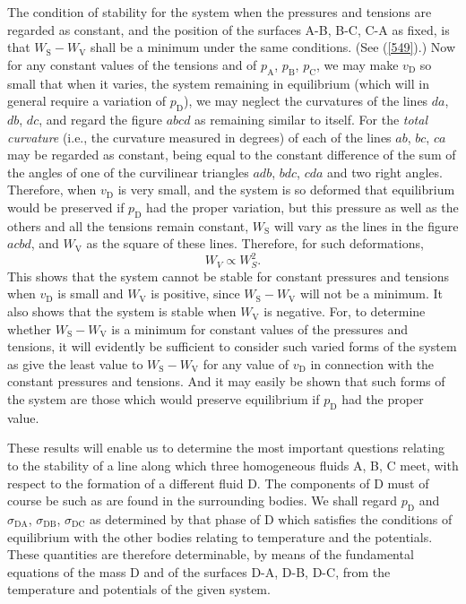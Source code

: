 \documentclass[12pt]{article}
\begin{document}
The condition of stability for the system when the pressures and tensions are regarded as constant, and the position of the surfaces A-B, B-C, C-A as fixed, is that $W_\text{S} - W_\text{V}$ shall be a minimum under the same conditions. (See (\ref{549}).) Now for any constant values of the tensions and of $p_\text{A}$, $p_\text{B}$, $p_\text{C}$, we may make $v_\text{D}$ so small that when it varies, the system remaining in equilibrium (which will in general require a variation of $p_\text{D}$), we may neglect the curvatures of the lines $da$, $db$, $dc$, and regard the figure $abcd$ as remaining similar to itself. For the \textit{total curvature} (i.e., the curvature measured in degrees) of each of the lines $ab$, $bc$, $ca$ may be regarded as constant, being equal to the constant difference of the sum of the angles of one of the curvilinear triangles $adb$, $bdc$, $cda$ and two right angles. Therefore, when $v_\text{D}$ is very small, and the system is so deformed that equilibrium would be preserved if $p_\text{D}$ had the proper variation, but this pressure as well as the others and all the tensions remain constant, $W_\text{S}$ will vary as the lines in the figure $acbd$, and $W_\text{V}$ as the square of these lines. Therefore, for such deformations,
$$ W_V \propto W_S^2. $$
This shows that the system cannot be stable for constant pressures and tensions when $v_\text{D}$ is small and $W_\text{V}$ is positive, since $W_\text{S}-W_\text{V}$ will not be a minimum. It also shows that the system is stable when $W_\text{V}$ is negative. For, to determine whether $W_\text{S}-W_\text{V}$ is a minimum for constant values of the pressures and tensions, it will evidently be sufficient to consider such varied forms of the system as give the least value to $W_\text{S}-W_\text{V}$ for any value of $v_\text{D}$ in connection with the constant pressures and tensions. And it may easily be shown that such forms of the system are those which would preserve equilibrium if $p_\text{D}$ had the proper value.

These results will enable us to determine the most important questions relating to the stability of a line along which three homogeneous fluids A, B, C meet, with respect to the formation of a different fluid D. The components of D must of course be such as are found in the surrounding bodies. We shall regard $p_\text{D}$ and $\sigma_{\text{DA}}$, $\sigma_{\text{DB}}$, $\sigma_{\text{DC}}$ as determined by that phase of D which satisfies the conditions of equilibrium with the other bodies relating to temperature and the potentials. These quantities are therefore determinable, by means of the fundamental equations of the mass D and of the surfaces D-A, D-B, D-C, from the temperature and potentials of the given system.
\end{document}

